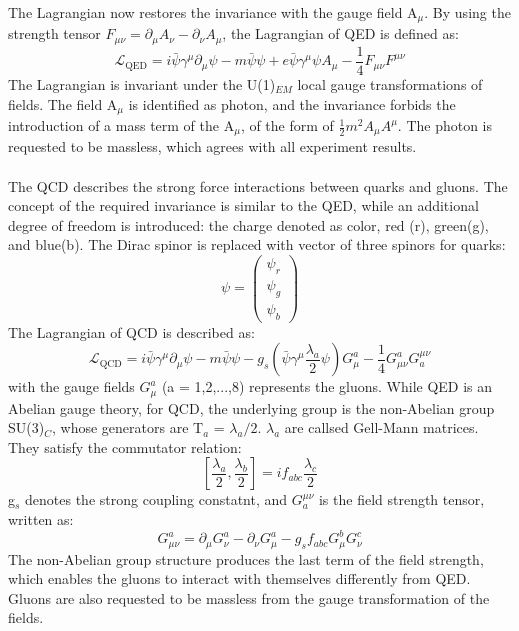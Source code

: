 The Lagrangian now restores the invariance with the gauge field A$_\mu$. By using the strength tensor $F_{\mu \nu}=\partial_{\mu} A_{\nu}-\partial_{\nu} A_{\mu}$, the Lagrangian of QED is defined as:
\begin{equation}
\label{eqn:QEDLagrangian}
\mathcal{L}_{\mathrm{QED}}=i \bar{\psi} \gamma^{\mu} \partial_{\mu} \psi-m \bar{\psi} \psi+e \bar{\psi} \gamma^{\mu} \psi A_{\mu}-\frac{1}{4} F_{\mu \nu} F^{\mu \nu}
\end{equation}
The Lagrangian is invariant under the U(1)$_{EM}$ local gauge transformations of fields. The field A$_\mu$ is identified as photon, and the invariance forbids the introduction of a mass term of the A$_\mu$, of the form of $\frac{1}{2}m^2 A_\mu A^\mu$. The photon is requested to be massless, which agrees with all experiment results.
\\

\noindent\textbf{} \\ 
The QCD describes the strong force interactions between quarks and gluons. The concept of the required invariance is similar to the QED, while an additional degree of freedom is introduced: the charge denoted as color, red (r), green(g), and blue(b). 
The Dirac spinor is replaced with vector of three spinors for quarks:
\begin{equation}
\psi=\left(\begin{array}{c}
\psi_{r} \\
\psi_{g} \\
\psi_{b}
\end{array}\right)
\end{equation}
The Lagrangian of QCD is described as:
\begin{equation}
\mathcal{L}_{\mathrm{QCD}}=i \bar{\psi} \gamma^{\mu} \partial_{\mu} \psi-m \bar{\psi} \psi-g_{s}\left(\bar{\psi} \gamma^{\mu} \frac{\lambda_{a}}{2} \psi\right) G_{\mu}^{a}-\frac{1}{4} G_{\mu \nu}^{a} G_{a}^{\mu \nu}
\end{equation}
with the gauge fields $G_{\mu}^{a}$ (a = 1,2,...,8) represents the gluons.
While QED is an Abelian gauge theory, for QCD, the underlying group is the non-Abelian group SU(3)$_C$, whose generators are T$_a$ = $\lambda_{a}/2$. $\lambda_{a}$ are callsed Gell-Mann matrices. They satisfy the commutator relation:
\begin{equation}
\left[\frac{\lambda_{a}}{2}, \frac{\lambda_{b}}{2}\right]=i f_{a b c} \frac{\lambda_{c}}{2}
\end{equation}
g$_s$ denotes the strong coupling constatnt, and $G_{a}^{\mu \nu}$ is the field strength tensor, written as:
\begin{equation}
G_{\mu \nu}^{a}=\partial_{\mu} G_{\nu}^{a}-\partial_{\nu} G_{\mu}^{a}-g_{s} f_{a b c} G_{\mu}^{b} G_{\nu}^{c}
\end{equation}
The non-Abelian group structure produces the last term of the field strength, which enables the gluons to interact with themselves differently from QED. Gluons are also requested to be massless from the gauge transformation of the fields.
\\ \\

